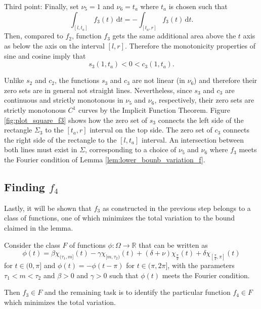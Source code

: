 \documentclass{article}
\newcommand{\dt}{\,\mathrm{d}t}
\newcommand{\R}{\mathbb{R}\xspace}
\begin{document}
Third point: Finally, set $\nu_5 = 1$ and $\nu_6 = t_a$ where $t_a$ is chosen such that 
\[\int_{[l, t_a]} f_3(t) \dt = - \int_{[t_a, r]} f_3(t) \dt.\]
Then, compared to $f_2$, function $f_3$ gets the same additional area above the $t$ axis as below the axis on the interval $[l,r]$.
Therefore the monotonicity properties of sine and cosine imply that
\[s_3(1,t_a) <  0 < c_3(1,t_a).\]

Unlike $s_2$ and $c_2$, the functions $s_3$ and $c_3$ are not linear (in $\nu_6$) and therefore their zero sets are in general not straight lines. Nevertheless, since $s_3$ and $c_3$ are continuous and strictly monotonous in $\nu_5$ and $\nu_6$, respectively, their zero sets are strictly monotonous $C^1$ curves by the Implicit Function Theorem. Figure \ref{fig:plot_square_f3} shows how the zero set of $s_3$ connects the left side of the rectangle $\Sigma_3$ to the $[t_a, r]$ interval on the top side. The zero set of $c_3$ connects the right side of the rectangle to the $[l, t_a]$ interval. An intersection between both lines must exist in $\Sigma$, corresponding to a choice of $\nu_5$ and $\nu_6$ where $f_3$ meets the Fourier condition of Lemma \ref{lem:lower_bounb_variation_f}.


\subsection{Finding $f_4$}

Lastly, it will be shown that $f_3$ as constructed in the previous step belongs to a class of functions, one of which minimizes the total variation to the bound claimed in the lemma.

Consider the class $F$ of functions $\phi: \Omega\rightarrow\R$ that can be written as
\begin{equation} \label{eq:def_f3}
    \phi(t) = \beta \chi_{(\tau_1,m]}(t) - \gamma\chi_{[m,\tau_2)}(t) +(\delta + \nu) \chi_{\frac{\pi}{2}}(t) + \delta \chi_{[\frac{\pi}{2}, \pi]}(t)
\end{equation}
for $t \in (0,\pi]$ and $\phi(t) = - \phi(t-\pi)$ for $t \in (\pi, 2\pi]$, with the parameters $\tau_1 < m < \tau_2$ and $\beta>0$ and $\gamma>0$ such that $\phi(t)$ meets the Fourier condition.

Then $f_3 \in F$ and the remaining task is to identify the particular function $f_4 \in F$ which minimizes the total variation.
\end{document}
